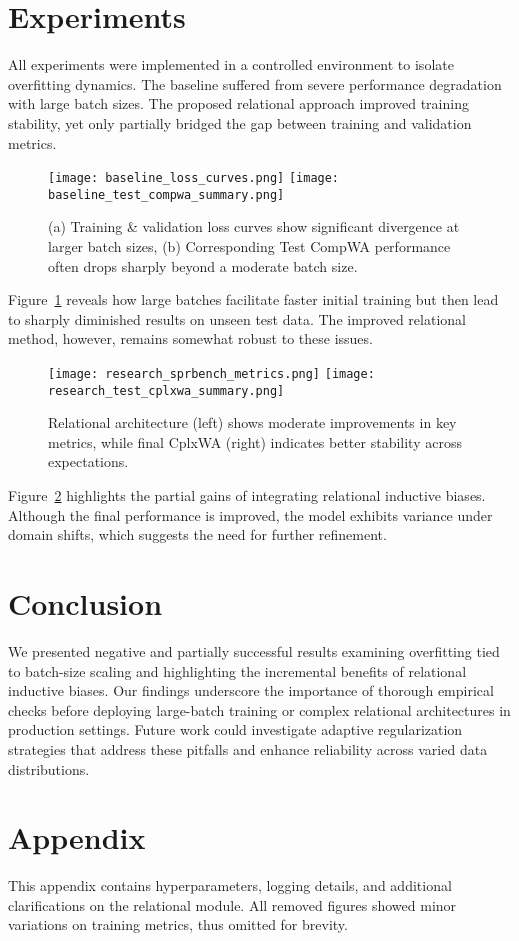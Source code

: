 \documentclass[11pt]{article}
\begin{document}
\section{Experiments}
All experiments were implemented in a controlled environment to isolate overfitting dynamics. The
baseline suffered from severe performance degradation with large batch sizes. The proposed
relational approach improved training stability, yet only partially bridged the gap between
training and validation metrics.

\begin{figure}[h]
  \centering
  \texttt{[image: baseline\_loss\_curves.png]}
  \hfill
  \texttt{[image: baseline\_test\_compwa\_summary.png]}
  \caption{(a) Training \& validation loss curves show significant divergence at larger batch
  sizes, (b) Corresponding Test CompWA performance often drops sharply beyond a moderate batch
  size.}
  \label{fig:baseline}
\end{figure}

Figure~\ref{fig:baseline} reveals how large batches facilitate faster initial training but then
lead to sharply diminished results on unseen test data. The improved relational method, however,
remains somewhat robust to these issues.

\begin{figure}[h]
  \centering
  \texttt{[image: research\_sprbench\_metrics.png]}
  \hfill
  \texttt{[image: research\_test\_cplxwa\_summary.png]}
  \caption{Relational architecture (left) shows moderate improvements in key metrics,
  while final CplxWA (right) indicates better stability across expectations.}
  \label{fig:relational}
\end{figure}

Figure~\ref{fig:relational} highlights the partial gains of integrating relational inductive biases.
Although the final performance is improved, the model exhibits variance under domain shifts, which
suggests the need for further refinement.

\section{Conclusion}
We presented negative and partially successful results examining overfitting tied to batch-size
scaling and highlighting the incremental benefits of relational inductive biases. Our findings
underscore the importance of thorough empirical checks before deploying large-batch training or
complex relational architectures in production settings. Future work could investigate adaptive
regularization strategies that address these pitfalls and enhance reliability across varied data
distributions.




\appendix
\section{Appendix}
This appendix contains hyperparameters, logging details, and additional clarifications on the
relational module. All removed figures showed minor variations on training metrics, thus omitted
for brevity.
\end{document}
